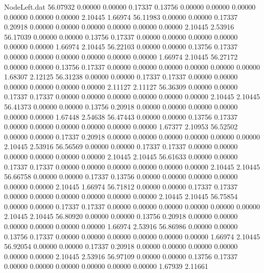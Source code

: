 \begin{filecontents}{NodeLeft.dat}
  56.07932    0.00000    0.00000     0.17337    0.13756    0.00000    0.00000    0.00000    0.00000    0.00000    0.00000    2.10445    1.66974
  56.11983    0.00000    0.00000     0.17337    0.20918    0.00000    0.00000    0.00000    0.00000    0.00000    0.00000    2.10445    2.53916
  56.17039    0.00000    0.00000     0.13756    0.17337    0.00000    0.00000    0.00000    0.00000    0.00000    0.00000    1.66974    2.10445
  56.22103    0.00000    0.00000     0.13756    0.17337    0.00000    0.00000    0.00000    0.00000    0.00000    0.00000    1.66974    2.10445
  56.27172    0.00000    0.00000     0.13756    0.17337    0.00000    0.00000    0.00000    0.00000    0.00000    0.00000    1.68307    2.12125
  56.31238    0.00000    0.00000     0.17337    0.17337    0.00000    0.00000    0.00000    0.00000    0.00000    0.00000    2.11127    2.11127
  56.36309    0.00000    0.00000     0.17337    0.17337    0.00000    0.00000    0.00000    0.00000    0.00000    0.00000    2.10445    2.10445
  56.41373    0.00000    0.00000     0.13756    0.20918    0.00000    0.00000    0.00000    0.00000    0.00000    0.00000    1.67448    2.54638
  56.47443    0.00000    0.00000     0.13756    0.17337    0.00000    0.00000    0.00000    0.00000    0.00000    0.00000    1.67377    2.10953
  56.52502    0.00000    0.00000     0.17337    0.20918    0.00000    0.00000    0.00000    0.00000    0.00000    0.00000    2.10445    2.53916
  56.56569    0.00000    0.00000     0.17337    0.17337    0.00000    0.00000    0.00000    0.00000    0.00000    0.00000    2.10445    2.10445
  56.61633    0.00000    0.00000     0.17337    0.17337    0.00000    0.00000    0.00000    0.00000    0.00000    0.00000    2.10445    2.10445
  56.66758    0.00000    0.00000     0.17337    0.13756    0.00000    0.00000    0.00000    0.00000    0.00000    0.00000    2.10445    1.66974
  56.71812    0.00000    0.00000     0.17337    0.17337    0.00000    0.00000    0.00000    0.00000    0.00000    0.00000    2.10445    2.10445
  56.75854    0.00000    0.00000     0.17337    0.17337    0.00000    0.00000    0.00000    0.00000    0.00000    0.00000    2.10445    2.10445
  56.80920    0.00000    0.00000     0.13756    0.20918    0.00000    0.00000    0.00000    0.00000    0.00000    0.00000    1.66974    2.53916
  56.86986    0.00000    0.00000     0.13756    0.17337    0.00000    0.00000    0.00000    0.00000    0.00000    0.00000    1.66974    2.10445
  56.92054    0.00000    0.00000     0.17337    0.20918    0.00000    0.00000    0.00000    0.00000    0.00000    0.00000    2.10445    2.53916
  56.97109    0.00000    0.00000     0.13756    0.17337    0.00000    0.00000    0.00000    0.00000    0.00000    0.00000    1.67939    2.11661

\end{filecontents}
